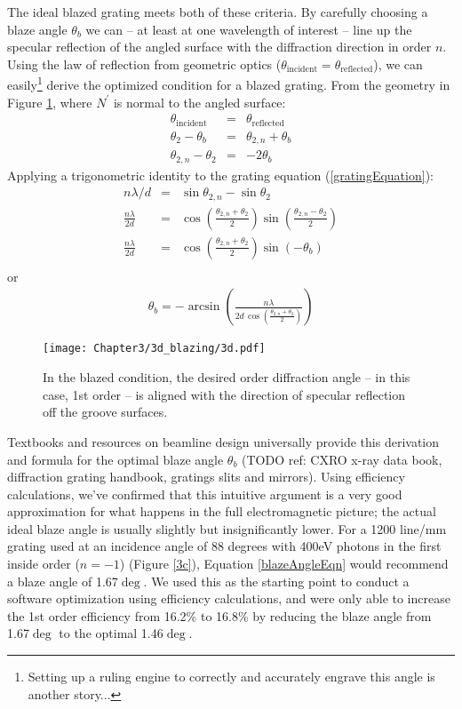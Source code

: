 The ideal blazed grating meets both of these criteria.  By carefully choosing a blaze angle $\theta_b$ we can -- at least at one wavelength of interest -- line up the specular reflection of the angled surface with the diffraction direction in order $n$.  Using the law of reflection from geometric optics ($\theta_{\mathrm{incident}} = \theta_{\mathrm{reflected}}$), we can easily\footnote{Setting up a ruling engine to correctly and accurately engrave this angle is another story...} derive the optimized condition for a blazed grating.  From the geometry in Figure \ref{3d}, where $N^\prime$ is normal to the angled surface: 
\begin{eqnarray}
\theta_{\mathrm{incident}} &=& \theta_{\mathrm{reflected}} \\
\theta_2 - \theta_b &=& \theta_{2,n} + \theta_b \\
\theta_{2,n} - \theta_{2} &=& -2 \theta_b
\end{eqnarray}
Applying a trigonometric identity to the grating equation (\ref{gratingEquation}):
\begin{eqnarray}
n\lambda / d &=& \sin\theta_{2,n} - \sin\theta_{2} \\
\frac{n\lambda}{2d} &=& \cos \left( \frac{\theta_{2,n} + \theta_{2}}{2} \right) \sin \left( \frac{\theta_{2,n} - \theta_{2}}{2} \right) \\
\frac{n\lambda}{2d} &=& \cos \left( \frac{\theta_{2,n} + \theta_{2}}{2} \right) \sin \left( -\theta_b \right) \\
\end{eqnarray}
or
\begin{eqnarray}
\label{blazeAngleEqn}
\theta_b = -\arcsin \left(   \frac{n \lambda}{2d \, \cos \left( \frac{\theta_{2,n} + \theta_{2}}{2} \right)}     \right)
\end{eqnarray}

\begin{figure}[htbp] %
   \centering
   \texttt{[image: Chapter3/3d\_blazing/3d.pdf]} 
   \caption{In the blazed condition, the desired order diffraction angle -- in this case, 1st order -- is aligned with the direction of specular reflection off the groove surfaces.}
   \label{3d}
\end{figure}

Textbooks and resources on beamline design universally provide this derivation and formula for the optimal blaze angle $\theta_b$ (TODO ref: CXRO x-ray data book, diffraction grating handbook, gratings slits and mirrors).  Using efficiency calculations, we've confirmed that this intuitive argument is a very good approximation for what happens in the full electromagnetic picture; the actual ideal blaze angle is usually slightly but insignificantly lower.  For a 1200 line/mm grating used at an incidence angle of 88 degrees with 400eV photons in the first inside order ($n=-1$) (Figure \ref{3c}), Equation \ref{blazeAngleEqn} would recommend a blaze angle of 1.67$\deg$.  We used this as the starting point to conduct a software optimization using efficiency calculations, and were only able to increase the 1st order efficiency from 16.2\% to 16.8\% by reducing the blaze angle from 1.67$\deg$ to the optimal 1.46$\deg$.

